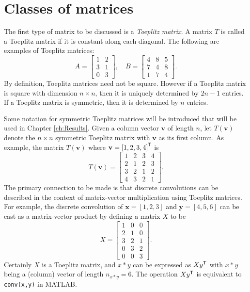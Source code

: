 \section{Classes of matrices} \label{sec:Classes of matrices}
The first type of matrix to be discussed is a \textit{Toeplitz matrix}. A matrix $T$ is called a Toeplitz matrix if it is constant along each diagonal. The following are examples of Toeplitz matrices:
\[A = \begin{bmatrix}
1 & 2 \\
3 & 1 \\
0 & 3
\end{bmatrix}, \quad 
B = \begin{bmatrix}
4 & 8 & 5 \\
7 & 4 & 8 \\
1 & 7 & 4
\end{bmatrix}.\]
By definition, Toeplitz matrices need not be square. However if a Toeplitz matrix is square with dimension $n \times n$, then it is uniquely determined by $2n-1$ entries. If a Toeplitz matrix is symmetric, then it is determined by $n$ entries. \par
Some notation for symmetric Toeplitz matrices will be introduced that will be used in Chapter \ref{ch:Results}. Given a column vector $\mathbf{v}$ of length $n$, let $T(\mathbf{v})$ denote the $n \times n$ symmetric Toeplitz matrix with $\mathbf{v}$ as its first column. As example, the matrix $T(\mathbf{v})$ where $\mathbf{v} = {[1,2,3,4]}^\mathsf{T}$ is
\[T(\mathbf{v}) = \begin{bmatrix}
1 & 2 & 3 & 4 \\
2 & 1 & 2 & 3 \\
3 & 2 & 1 & 2 \\
4 & 3 & 2 & 1 
\end{bmatrix}.\] 
The primary connection to be made is that discrete convolutions can be described in the context of matrix-vector multiplication using Toeplitz matrices. For example, the discrete convolution of $\mathbf{x} = [1,2,3]$ and $\mathbf{y} = [4,5,6]$ can be cast as a matrix-vector product by defining a matrix $X$ to be
\[X = \begin{bmatrix}
1 & 0 & 0  \\
2 & 1 & 0 \\
3 & 2 & 1 \\
0 & 3 & 2 \\
0 & 0 & 3 
\end{bmatrix}.\]
Certainly $X$ is a Toeplitz matrix, and $x*y$ can be expressed as $X{y}^\mathsf{T}$ with $x*y$ being a (column) vector of length $n_{x*y} = 6$. The operation $X{y}^\mathsf{T}$ is equivalent to \texttt{conv(x,y)} in MATLAB. \par 
